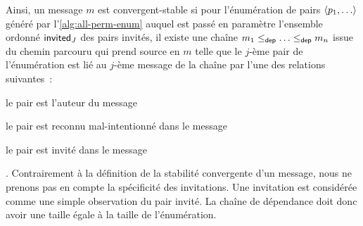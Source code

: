 Ainsi, un message $m$ est convergent-stable si pour l'énumération de pairs $\tuple*{p_1, \dotsc}$ généré par l'\autoref{alg:all-perm-enum} auquel est passé en paramètre l'ensemble ordonné $\operatorname{\mathsf{invited}}_J$ des pairs invités, il existe une chaîne $m_1 \leq_{\operatorname{\mathsf{dep}}} \dotsc \leq_{\operatorname{\mathsf{dep}}} m_n$ issue du chemin parcouru qui prend source en $m$ telle que le $j$-ème pair de l'énumération est lié au $j$-ème message de la chaîne par l'une des relations suivantes~: \begin{inlinelist}
    \item le pair est l'auteur du message
    \item le pair est reconnu mal-intentionné dans le message
    \item le pair est invité dans le message
\end{inlinelist}.
Contrairement à la définition de la stabilité convergente d'un message, nous ne prenons pas en compte la spécificité des invitations.
Une invitation est considérée comme une simple observation du pair invité.
La chaîne de dépendance doit donc avoir une taille égale à la taille de l'énumération.

